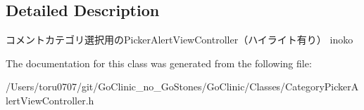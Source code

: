 \subsection{Detailed Description}
コメントカテゴリ選択用のPickerAlertViewController（ハイライト有り）  inoko 

The documentation for this class was generated from the following file:\begin{DoxyCompactItemize}
\item 
/Users/toru0707/git/GoClinic\_\-no\_\-GoStones/GoClinic/Classes/CategoryPickerAlertViewController.h\end{DoxyCompactItemize}

